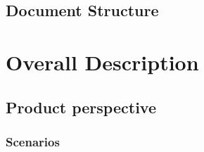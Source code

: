 \documentclass{Configuration_Files/PoliMi3i_thesis}
\begin{document}
\section{Document Structure}

\chapter{Overall Description}

\section{Product perspective}

\subsection{Scenarios}
\end{document}
